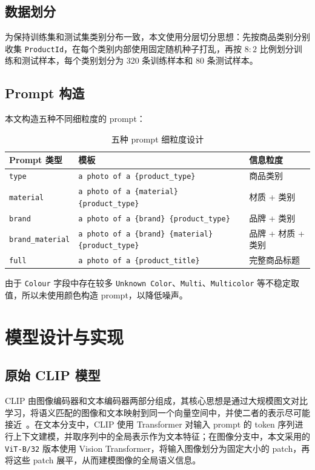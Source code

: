 \documentclass[11pt, a4paper]{ctexart}
\begin{document}
\subsection{数据划分}

为保持训练集和测试集类别分布一致，本文使用分层切分思想：先按商品类别分别收集 \texttt{ProductId}，在每个类别内部使用固定随机种子打乱，再按 $8:2$ 比例划分训练和测试样本，每个类别划分为 320 条训练样本和 80 条测试样本。

\subsection{Prompt 构造}

本文构造五种不同细粒度的 prompt：
\begin{table}[!htbp]
    \centering
    \caption{五种 prompt 细粒度设计}
    \label{tab:prompt-design}
    \begin{tabular}{lll}
        \toprule
        \textbf{Prompt 类型} & \textbf{模板} & \textbf{信息粒度} \\
        \midrule
        \texttt{type} & \texttt{a photo of a \{product\_type\}} & 商品类别 \\
        \texttt{material} & \texttt{a photo of a \{material\} \{product\_type\}} & 材质 + 类别 \\
        \texttt{brand} & \texttt{a photo of a \{brand\} \{product\_type\}} & 品牌 + 类别 \\
        \texttt{brand\_material} & \texttt{a photo of a \{brand\} \{material\} \{product\_type\}} & 品牌 + 材质 + 类别 \\
        \texttt{full} & \texttt{a photo of a \{product\_title\}} & 完整商品标题 \\
        \bottomrule
    \end{tabular}
\end{table}

由于 \texttt{Colour} 字段中存在较多 \texttt{Unknown Color}、\texttt{Multi}、\texttt{Multicolor} 等不稳定取值，所以未使用颜色构造 prompt，以降低噪声。

\section{模型设计与实现}

\subsection{原始 CLIP 模型}

CLIP 由图像编码器和文本编码器两部分组成，其核心思想是通过大规模图文对比学习，将语义匹配的图像和文本映射到同一个向量空间中，并使二者的表示尽可能接近~\cite{radford2021clip}。在文本分支中，CLIP 使用 Transformer 对输入 prompt 的 token 序列进行上下文建模，并取序列中的全局表示作为文本特征；在图像分支中，本文采用的 \texttt{ViT-B/32} 版本使用 Vision Transformer，将输入图像划分为固定大小的 patch，再将这些 patch 展平，从而建模图像的全局语义信息。
\end{document}
